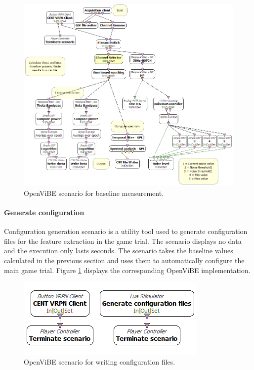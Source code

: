 \begin{figure}[h]
	\centering
	\includegraphics[scale=0.3]{baseline.png}
	\caption{OpenViBE scenario for baseline measurement.}
\end{figure}  

\paragraph{Generate configuration}
Configuration generation scenario is a utility tool used to generate configuration files for the feature extraction in the game trial. The scenario displays no data and the execution only lasts seconds. The scenario takes the baseline values calculated in the previous section and uses them to automatically configure the main game trial. Figure \ref{configuration} displays the corresponding OpenViBE implementation.

\begin{figure}[h]
	\centering
	\includegraphics[scale=0.4]{config.png}
	\caption{OpenViBE scenario for writing configuration files.}\label{configuration}
\end{figure}  


